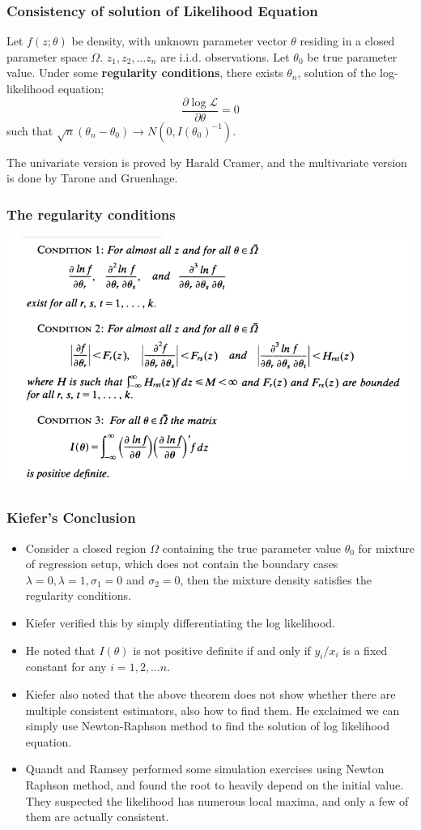 \documentclass{beamer}
\begin{document}
\begin{frame}
	\frametitle{Consistency of solution of Likelihood Equation}
	\begin{theorem}
		Let $f(z;\theta)$ be density, with unknown parameter vector $\theta$ residing in a closed parameter space $\Omega$. $z_1, z_2, \dots z_n$ are i.i.d. observations. Let $\theta_0$ be true parameter value. Under some \textbf{regularity conditions}, there exists $\theta_n$, solution of the log-likelihood equation;
		$$\frac{\partial\log\mathcal{L}}{\partial\theta} = 0$$
		such that $\sqrt{n}(\theta_n - \theta_0) \rightarrow N(0, I(\theta_0)^{-1})$.
	\end{theorem}
	The univariate version is proved by Harald Cramer, and the multivariate version is done by Tarone and Gruenhage.
\end{frame}
\begin{frame}
	\frametitle{The regularity conditions}
	\includegraphics[width = \linewidth]{./reg_conditions.png}
\end{frame}

\begin{frame}
	\frametitle{Kiefer's Conclusion}
	\begin{itemize}
		\item Consider a closed region $\Omega$ containing the true parameter value $\theta_0$ for mixture of regression setup, which does not contain the boundary cases $\lambda = 0, \lambda = 1, \sigma_1 = 0$ and $\sigma_2 = 0$, then the mixture density satisfies the regularity conditions.
		\item Kiefer verified this by simply differentiating the log likelihood.
		\item He noted that $I(\theta)$ is not positive definite if and only if $y_i/x_i$ is a fixed constant for any $i=1,2,\dots n$.
		\item Kiefer also noted that the above theorem does not show whether there are multiple consistent estimators, also how to find them. He exclaimed we can simply use Newton-Raphson method to find the solution of log likelihood equation.
		\item Quandt and Ramsey performed some simulation exercises using Newton Raphson method, and found the root to heavily depend on the initial value. They suspected the likelihood has numerous local maxima, and only a few of them are actually consistent.
	\end{itemize}
\end{frame}
\end{document}
